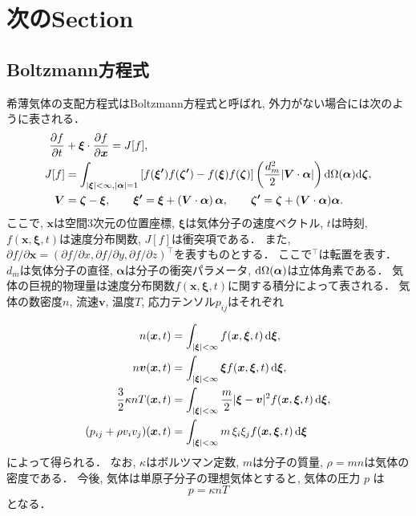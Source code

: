 \documentclass[./main]{subfiles}
\begin{document}
\section{次のSection}

\subsection{Boltzmann方程式}
希薄気体の支配方程式はBoltzmann方程式と呼ばれ, 外力がない場合には次のように表される．
\begin{align}
  \frac{\partial f}{\partial t} &+ \bm{\xi}\cdot\frac{\partial f}{\partial \bm{x}}=J[f], 
    \label{eq:Boltzmann}\\
  J[f] 
    &= \int_{|\bm{\xi}|<\infty,|\bm{\alpha}|=1}
      \left[ f(\bm{\xi^\prime})f(\bm{\zeta^\prime})-f(\bm{\xi})f(\bm{\zeta}) \right] 
      \left( \frac{d_m^2}{2}|\bm{V}\cdot\bm{\alpha}|\right)
      \mathrm{d}\Omega(\bm{\alpha})\mathrm{d}\bm{\zeta}, \notag\\
  \bm{V} &= \bm{\zeta} - \bm{\xi}, \qquad
  \bm{\xi^\prime} = \bm{\xi} + \left(\bm{V}\cdot\bm{\alpha}\right)\bm{\alpha}, \qquad
  \bm{\zeta^\prime} = \bm{\zeta} + (\bm{V}\cdot\bm{\alpha})\bm{\alpha}. \notag
\end{align}
ここで, $\bm{x}$は空間3次元の位置座標, $\bm{\xi}$は気体分子の速度ベクトル, $t$は時刻, $f(\bm{x},\bm{\xi},t)$は速度分布関数, $J[f]$は衝突項である．
また, $\partial f/\partial\bm{x}=(\partial f/\partial x,\partial f/\partial y,\partial f/\partial z)^\top$を表すものとする．
ここで${}^\top$は転置を表す．
$d_m$は気体分子の直径, $\bm{\alpha}$は分子の衝突パラメータ, $\mathrm{d}\Omega(\bm{\alpha})$は立体角素である．
気体の巨視的物理量は速度分布関数$f(\bm{x},\bm{\xi},t)$に関する積分によって表される．
気体の数密度$n$, 流速$\bm{v}$, 温度$T$, 応力テンソル$p_{ij}$はそれぞれ
\begin{subeq}
\begin{align}
  n(\bm{x},t) &= 
    \int_{|\bm{\xi}|<\infty}
    f(\bm{x},\bm{\xi},t) \,\mathrm{d}\bm{\xi}, \label{eq:n}\\
  n\bm{v}(\bm{x},t) &= 
    \int_{|\bm{\xi}|<\infty}
    \bm{\xi}f(\bm{x},\bm{\xi},t) \,\mathrm{d}\bm{\xi}, \label{eq:v}\\
  \frac{3}{2} \kappa n T(\bm{x},t) &= 
    \int_{|\bm{\xi}|<\infty}
    \frac{m}{2}|\bm{\xi}-\bm{v}|^2f(\bm{x},\bm{\xi},t) \,\mathrm{d}\bm{\xi}, 
    \label{eq:T}\\
  (p_{ij}+\rho v_iv_j)(\bm{x},t) &= 
    \int_{|\bm{\xi}|<\infty}
    m\,\xi_i\xi_jf(\bm{x},\bm{\xi},t)\,\mathrm{d}\bm{\xi} \label{eq:pij}
\end{align}
によって得られる．
なお, $\kappa$はボルツマン定数, $m$は分子の質量, $\rho=mn$は気体の密度である．
今後, 気体は単原子分子の理想気体とすると, 気体の圧力 $p$ は
\begin{equation}
  p = \kappa nT \label{eq:p}
\end{equation}
となる．
\end{subeq}
\end{document}
